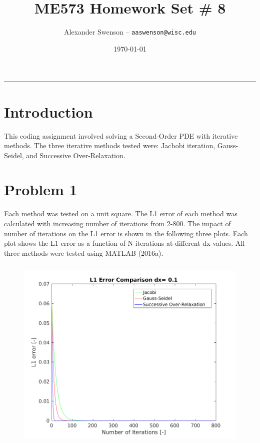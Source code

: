 \documentclass[12pt]{article}
\title{ME573 Homework Set \# 8}
\author{Alexander Swenson -- \texttt{aaswenson@wisc.edu}}
\date{\today}
\begin{document}
	
	\maketitle
	
	\vspace{-0.3in}
	\noindent
	\rule{\linewidth}{0.4pt}
	
	\noindent
	
	
	\section{Introduction}
	
	\noindent This coding assignment involved solving a Second-Order PDE with iterative methods. The three iterative methods tested were: Jacbobi iteration, Gauss-Seidel, and Successive Over-Relaxation.
	
	
	\section{Problem 1}
	
	\noindent Each method was tested on a unit square. The L1 error of each method was calculated with increasing number of iterations from 2-800. The impact of number of iterations on the L1 error is shown in the following three plots. Each plot shows the L1 error as a function of N iterations at different dx values. All three methods were tested using MATLAB (2016a).
	
	\begin{figure}[H]
		\centering
		\includegraphics[height=3.75in]{p1_01.png}
		\label{fig:problem2_plot}
	\end{figure}
	
\end{document}
